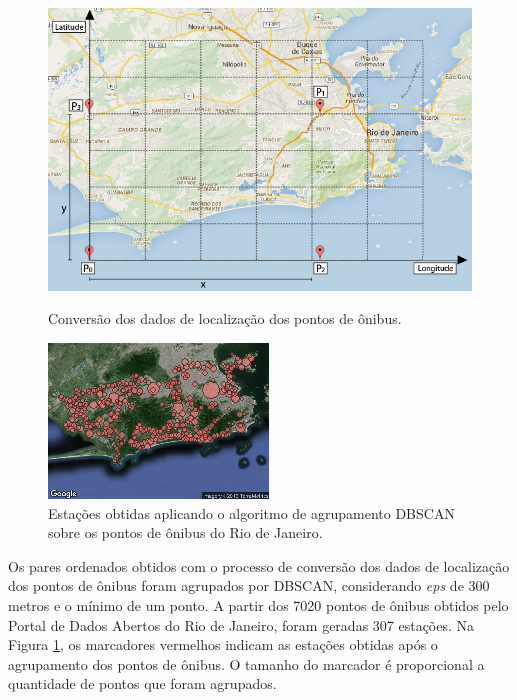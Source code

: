 \documentclass[12pt]{report} %
\begin{document}
\begin{figure}[!ht]
	\centering
	\begin{minipage}[t]{0.49\textwidth}
		\includegraphics[width=\textwidth]{conversao.png}
		\caption
		{
			Conversão dos dados de localização dos pontos de ônibus.
		}
		\label{fig:conversao}
	\end{minipage}
	\hfill
	\begin{minipage}[t]{0.47\textwidth}
		\includegraphics[width=\textwidth]{stations-v3.png}
		\caption
		{
			Estações obtidas aplicando o algoritmo de agrupamento DBSCAN sobre os pontos de ônibus do Rio de Janeiro.
		}
		\label{fig:stacoes}
	\end{minipage}	
\end{figure}

Os pares ordenados obtidos com o processo de conversão dos dados de localização dos pontos de ônibus foram agrupados por DBSCAN, considerando \emph{eps} de 300 metros e o mínimo de um ponto. A partir dos 7020 pontos de ônibus obtidos pelo Portal de Dados Abertos do Rio de Janeiro, foram geradas 307 estações. Na Figura \ref{fig:stacoes}, os marcadores vermelhos indicam as estações obtidas após o agrupamento dos pontos de ônibus. O tamanho do marcador é proporcional a quantidade de pontos que foram agrupados.
\end{document}
